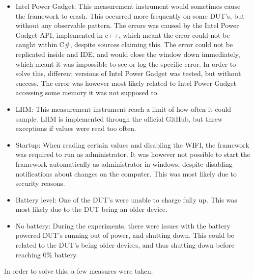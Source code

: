 \begin{itemize}
    \item Intel Power Gadget: This measurement instrument would sometimes cause the framework to crash. This occurred more frequently on some DUT's, but without any observable pattern. The errors was caused by the Intel Power Gadget API, implemented in c++, which meant the error could not be caught within C\#, despite sources claiming this\cite[]{cpp_exceptions}. The error could not be replicated inside and IDE, and would close the window down immediately, which meant it was impossible to see or log the specific error. In order to solve this, different versions of Intel Power Gadget was tested, but without success. The error was however most likely related to Intel Power Gadget accessing some memory it was not supposed to.
    \item LHM: This measurement instrument reach a limit of how often it could sample. LHM is implemented through the official GitHub, but threw exceptions if values were read too often.
    \item Startup: When reading certain values and disabling the WIFI, the framework was required to run as administrator. It was however not possible to start the framework automatically as administrator in windows, despite disabling notifications about changes on the computer. This was most likely due to security reasons.
    \item Battery level: One of the DUT's were unable to charge fully up. This was most likely due to the DUT being an older device.
    \item No battery: During the experiments, there were issues with the battery powered DUT's running out of power, and shutting down. This could be related to the DUT's being older devices, and thus shutting down before reaching 0\% battery.
\end{itemize}

In order to solve this, a few measures were taken:

